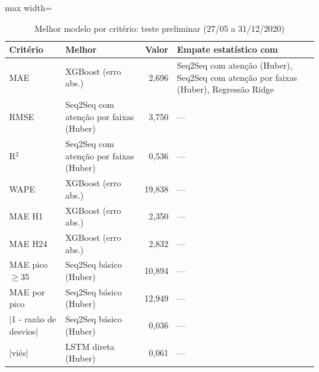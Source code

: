\begin{table}[!htbp]
    \centering
    \caption{Melhor modelo por critério: teste preliminar (27/05 a 31/12/2020)}
    \label{tab:vitorias_teste_historico}
    \small
    \begin{adjustbox}{max width=\textwidth}
    \begin{tabular}{llr>{\raggedright\arraybackslash}p{}}
        \toprule
        Critério & Melhor & Valor & Empate estatístico com \\
        \midrule
        MAE & XGBoost (erro abs.) & 2,696 & Seq2Seq com atenção (Huber), Seq2Seq com atenção por faixas (Huber), Regressão Ridge \\
        RMSE & Seq2Seq com atenção por faixas (Huber) & 3,750 & --- \\
        R$^2$ & Seq2Seq com atenção por faixas (Huber) & 0,536 & --- \\
        WAPE & XGBoost (erro abs.) & 19,838 & --- \\
        MAE H1 & XGBoost (erro abs.) & 2,350 & --- \\
        MAE H24 & XGBoost (erro abs.) & 2,832 & --- \\
        MAE pico $\geq$35 & Seq2Seq básico (Huber) & 10,894 & --- \\
        MAE por pico & Seq2Seq básico (Huber) & 12,949 & --- \\
        |1 - razão de desvios| & Seq2Seq básico (Huber) & 0,036 & --- \\
        |viés| & LSTM direta (Huber) & 0,061 & --- \\
        \bottomrule
    \end{tabular}
    \end{adjustbox}
\end{table}
